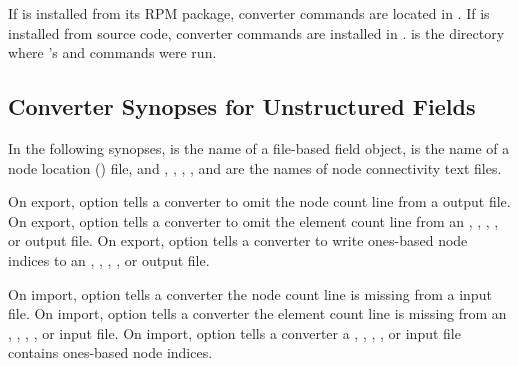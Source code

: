 If \sr{} is installed from its RPM package, converter commands are
located in .  If \sr{} is installed
from source code, converter commands are installed in
.   is
the directory where \sr{}'s  and 
commands were run.

\subsection{Converter Synopses for Unstructured Fields}
\label{sec:unstruct_field_synopses}

In the following synopses,  is the name of a \sr{}
file-based field object,  is the name of a node location
() file, and , ,
, , and  are the names of node
connectivity text files.

On export, option  tells a converter to omit the
node count line from a  output file.  On export, option
 tells a converter to omit the element count
line from an , , ,
, or  output file.  On export, option
 tells a converter to write ones-based node
indices to an , , ,
, or  output file.

On import, option  tells a converter the node
count line is missing from a  input file.  On import,
option  tells a converter the element count
line is missing from an , ,
, , or  input file.  On
import, option  tells a converter a
, , , , or
 input file contains ones-based node indices.


